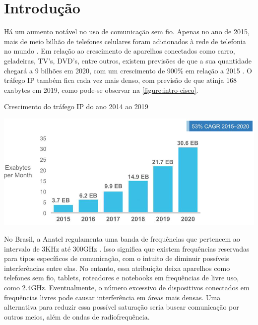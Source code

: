 	\chapter*[Introdução]{Introdução} %

	Há um aumento notável no uso de comunicação sem fio\cite{load-balancing}. Apenas no ano de 2015, mais de meio bilhão de telefones celulares foram adicionados à rede de telefonia no mundo \cite{cisco-forecast}. Em relação ao crescimento de aparelhos conectados como carro, geladeiras, TV’s, DVD’s, entre outros, existem previsões de que a sua quantidade chegará a 9 bilhões em 2020, com um crescimento de 900\% em relação a 2015 \cite{erricson-report}. O tráfego IP também fica cada vez mais denso, com previsão de que atinja 168 exabytes em 2019, como pode-se observar na \autoref{figure:intro-cisco}.

	\begin{chart}[ht!]
		\caption{\label{figure:intro-cisco}Crescimento do tráfego IP do ano 2014 ao 2019}
		\begin{center}
			\includegraphics[scale=0.5]{cisco_exabytes_per_month.png}
		\end{center}
	\end{chart}

	No Brasil, a Anatel regulamenta uma banda de frequências que pertencem ao intervalo  de 3KHz até 300GHz \cite{faixa-anatel}. Isso significa que existem frequências reservadas para tipos específicos de comunicação, com o intuito de diminuir possíveis interferências entre elas. No entanto, essa atribuição deixa aparelhos como telefones sem fio, tablets, roteadores e notebooks em frequências de livre uso, como 2.4GHz. Eventualmente, o número excessivo de dispositivos conectados em  frequências livres pode causar interferência em áreas mais densas. Uma alternativa para reduzir essa possível saturação seria buscar comunicação por outros meios, além de ondas de radiofrequência.\par

